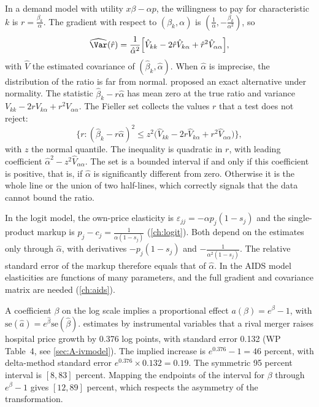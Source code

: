 \begin{example}\label{ex:A-delta-ratio}
In a demand model with utility $x\beta - \alpha p$, the willingness to pay for characteristic $k$ is $r =
\frac{\beta_k}{\alpha}$. The gradient with respect to $(\beta_k, \alpha)$ is $(\frac{1}{\alpha}, -\frac{\beta_k}
{\alpha^2})$, so
\begin{equation*}
  \widehat{\Var}(\hat r) = \frac{1}{\hat\alpha^2}\Bigl[\hat V_{kk} - 2\hat r\hat V_{k\alpha} + \hat r^2\hat V_{\alpha\alpha}\Bigr],
\end{equation*}
with $\hat V$ the estimated covariance of $(\hat\beta_k, \hat\alpha)$. When $\hat\alpha$ is imprecise, the
distribution of the ratio is far from normal. \citet{Fieller1954} proposed an exact alternative under normality.
The statistic $\hat\beta_k - r\hat\alpha$ has mean zero at the true ratio and variance $V_{kk} - 2rV_{k\alpha} +
r^2V_{\alpha\alpha}$. The Fieller set collects the values $r$ that a test does not reject:
\begin{equation*}
  \bigl\{r : (\hat\beta_k - r\hat\alpha)^2 \le z^2\bigl(\hat V_{kk} - 2r\hat V_{k\alpha} + r^2\hat V_{\alpha\alpha}\bigr)\bigr\},
\end{equation*}
with $z$ the normal quantile. The inequality is quadratic in $r$, with leading coefficient $\hat\alpha^2 - z^2\hat
V_{\alpha\alpha}$. The set is a bounded interval if and only if this coefficient is positive, that is, if $\hat\alpha$
is significantly different from zero. Otherwise it is the whole line or the union of two half-lines, which correctly
signals that the data cannot bound the ratio.
\end{example}

\begin{example}\label{ex:A-delta-logit}
In the logit model, the own-price elasticity is $\varepsilon_{jj} = -\alpha p_j(1 - s_j)$ and the single-product markup is
$p_j - c_j = \frac{1}{\alpha(1 - s_j)}$ (\cref{ch:logit}). Both depend on the estimates only through $\hat\alpha$,
with derivatives $-p_j(1 - s_j)$ and $-\frac{1}{\alpha^2(1 - s_j)}$. The relative standard error of the markup
therefore equals that of $\hat\alpha$. In the AIDS model elasticities are functions of many parameters, and the
full gradient and covariance matrix are needed (\cref{ch:aids}).
\end{example}

\begin{example}\label{ex:A-delta-log}
A coefficient $\beta$ on the log scale implies a proportional effect $a(\beta) = e^\beta - 1$, with
$\mathrm{se}(\hat a) = e^{\hat\beta}\mathrm{se}(\hat\beta)$. \citet{Dafny2009} estimates by instrumental variables
that a rival merger raises hospital price growth by 0.376 log points, with standard error 0.132 (WP Table~4, see
\cref{sec:A-ivmodel}). The implied increase is $e^{0.376} - 1 = 46$ percent, with delta-method standard error
$e^{0.376}\times 0.132 = 0.19$. The symmetric 95 percent interval is $[8, 83]$ percent. Mapping the endpoints of the
interval for $\beta$ through $e^\beta - 1$ gives $[12, 89]$ percent, which respects the asymmetry of the
transformation.
\end{example}

